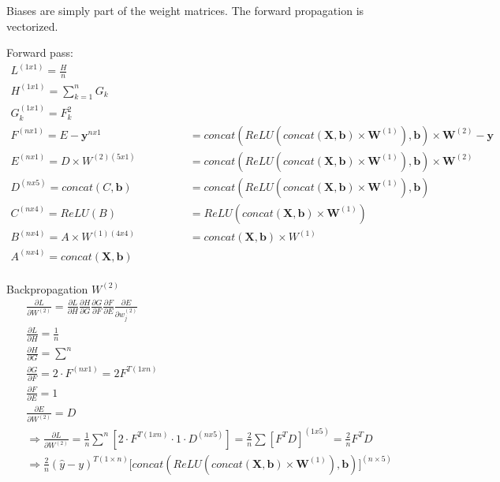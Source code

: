 \clearpage

\begin{exercise}[Backpropagate]

Biases are simply part of the weight matrices. The forward propagation is vectorized.

\newcommand{\starchen}{\qquad \star}

\begingroup
\allowdisplaybreaks
Forward pass:
\begin{align*}
L^{(1x1)} = \frac{H}{n} \qquad & \\
H^{(1x1)} = \sum_{k=1}^n G_{k} \qquad & \\
G_k^{(1x1)} = F_k^2 \qquad & \\
F^{(nx1)} = E - \textbf{y}^{nx1} \qquad & \qquad = concat( ReLU(concat(\textbf{X},\textbf{b}) \times \textbf{W}^{(1)}), \textbf{b}) \times \textbf{W}^{(2)} - \textbf{y}\\
E^{(nx1)} = D \times W^{(2)(5x1)} \qquad & \qquad = concat( ReLU(concat(\textbf{X},\textbf{b}) \times \textbf{W}^{(1)}), \textbf{b}) \times \textbf{W}^{(2)} \\
D^{(nx5)} = concat(C,\textbf{b}) \qquad & \qquad = concat( ReLU(concat(\textbf{X},\textbf{b}) \times \textbf{W}^{(1)}), \textbf{b})\\
C^{(nx4)} = ReLU(B)  \qquad & \qquad  = ReLU(concat(\textbf{X},\textbf{b}) \times \textbf{W}^{(1)})\\
B^{(nx4)} = A \times W^{(1)(4x4)} \qquad & \qquad = concat(\textbf{X},\textbf{b}) \times W^{(1)}\\
A^{(nx4)} = concat(\textbf{X},\textbf{b}) \qquad & \\
\end{align*}

Backpropagation $W^{(2)}$
\begin{align*}
& \frac{\partial L}{\partial W^{(2)}} = \frac{\partial L}{\partial H} \frac{\partial H}{\partial G} \frac{\partial G}{\partial F} \frac{\partial F}{\partial E} \frac{\partial E}{\partial w^{(2)}_{j}} \\
& \frac{\partial L}{\partial H} = \frac{1}{n}  \\
& \frac{\partial H}{\partial G} = \sum^n \\
& \frac{\partial G}{\partial F} = 2 \cdot F^{(nx1)} = 2 F^{T(1xn)} \\
& \frac{\partial F}{\partial E} = 1 \\
& \frac{\partial E}{\partial W^{(2)}} = D \\
& \Rightarrow \frac{\partial L}{\partial W^{(2)}} = \frac{1}{n} \sum^n [2 \cdot F^{T(1xn)} \cdot 1 \cdot D^{(nx5)}] = \frac{2}{n} \sum[F^T D]^{(1x5)} = \frac{2}{n} F^T D \\
& \Rightarrow \frac{2}{n} (\hat{y} - y)^{T(1\times n)} \Bigg[ concat( ReLU(concat(\textbf{X},\textbf{b}) \times \textbf{W}^{(1)}), \textbf{b}) \Bigg]^{(n\times 5)}
\end{align*}


\end{exercise}
